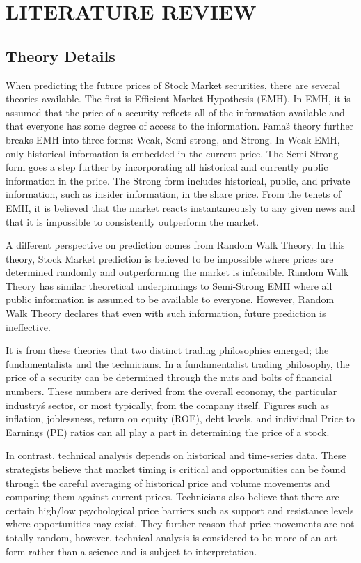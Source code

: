 \section{LITERATURE REVIEW}
\subsection{Theory Details}
When predicting the future prices of Stock Market securities, there are several theories available. The first is Efficient Market Hypothesis (EMH). In EMH, it is assumed that the price of a security reflects all of the information available and that everyone has some degree of access to the information. Fama\"s theory further breaks EMH into three forms: Weak, Semi-strong, and Strong. In Weak EMH, only historical information is embedded in the current price. The Semi-Strong form goes a step further by incorporating all historical and currently public information in the price. The Strong form includes historical, public, and private information, such as insider information, in the share price. From the tenets of EMH, it is believed that the market reacts instantaneously to any given news and that it is impossible to consistently outperform the market.

 A different perspective on prediction comes from Random Walk Theory. In this theory, Stock Market prediction is believed to be impossible where prices are determined randomly and outperforming the market is infeasible. Random Walk Theory has similar theoretical underpinnings to Semi-Strong EMH where all public information is assumed to be available to everyone. However, Random Walk Theory declares that even with such information, future prediction is ineffective.

 It is from these theories that two distinct trading philosophies emerged; the fundamentalists and the technicians. In a fundamentalist trading philosophy, the price of a security can be determined through the nuts and bolts of financial numbers. These numbers are derived from the overall economy, the particular industry\'s sector, or most typically, from the company itself. Figures such as inflation, joblessness, return on equity (ROE), debt levels, and individual Price to Earnings (PE) ratios can all play a part in determining the price of a stock.

 In contrast, technical analysis depends on historical and time-series data. These strategists believe that market timing is critical and opportunities can be found through the careful averaging of historical price and volume movements and comparing them against current prices. Technicians also believe that there are certain high/low psychological price barriers such as support and resistance levels where opportunities may exist. They further reason that price movements are not totally random, however, technical analysis is considered to be more of an art form rather than a science and is subject to interpretation.

